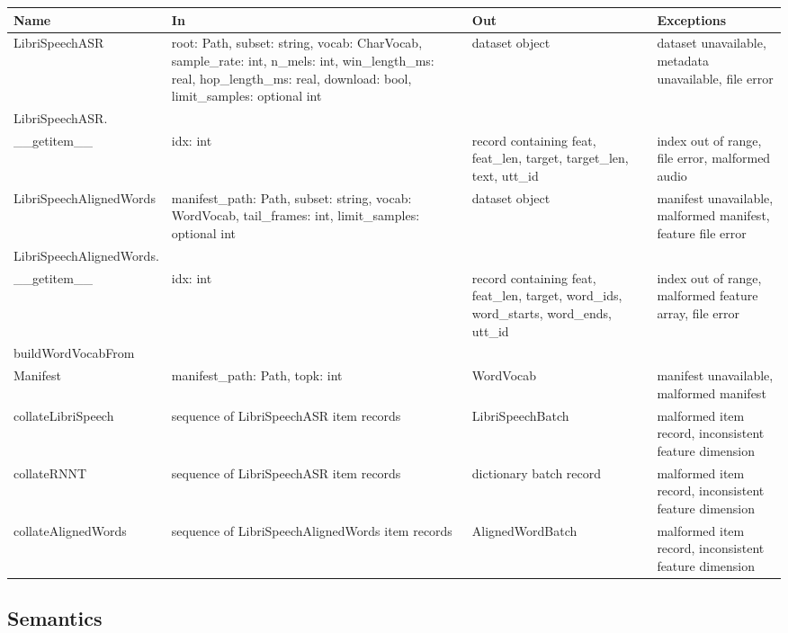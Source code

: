 \documentclass[12pt, titlepage]{article}
\begin{document}
\begin{center}
\begin{tabular}{p{4.6cm} p{4.6cm} p{3.8cm} p{3.0cm}}
\hline
\textbf{Name} & \textbf{In} & \textbf{Out} & \textbf{Exceptions} \\
\hline
LibriSpeechASR &
root: Path, subset: string, vocab: CharVocab, sample\_rate: int, n\_mels: int, win\_length\_ms: real, hop\_length\_ms: real, download: bool, limit\_samples: optional int &
dataset object &
dataset unavailable, metadata unavailable, file error \\

LibriSpeechASR.\\\_\_getitem\_\_ &
idx: int &
record containing feat, feat\_len, target, target\_len, text, utt\_id &
index out of range, file error, malformed audio \\

LibriSpeechAlignedWords &
manifest\_path: Path, subset: string, vocab: WordVocab, tail\_frames: int, limit\_samples: optional int &
dataset object &
manifest unavailable, malformed manifest, feature file error \\

LibriSpeechAlignedWords.\\\_\_getitem\_\_ &
idx: int &
record containing feat, feat\_len, target, word\_ids, word\_starts, word\_ends, utt\_id &
index out of range, malformed feature array, file error \\

buildWordVocabFrom\\Manifest &
manifest\_path: Path, topk: int &
WordVocab &
manifest unavailable, malformed manifest \\

collateLibriSpeech &
sequence of LibriSpeechASR item records &
LibriSpeechBatch &
malformed item record, inconsistent feature dimension \\

collateRNNT &
sequence of LibriSpeechASR item records &
dictionary batch record &
malformed item record, inconsistent feature dimension \\

collateAlignedWords &
sequence of LibriSpeechAlignedWords item records &
AlignedWordBatch &
malformed item record, inconsistent feature dimension \\
\hline
\end{tabular}
\end{center}

\subsection{Semantics}
\end{document}
